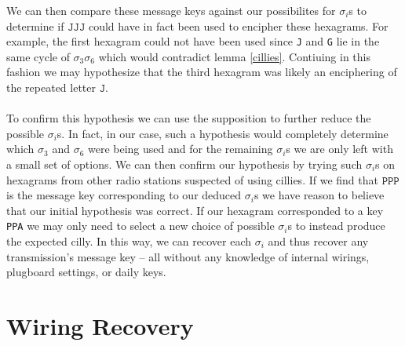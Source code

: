 We can then compare these message keys against our possibilites for $\sigma_i$s to determine if $\texttt{JJJ}$ could have in fact been used to encipher these hexagrams. For example, the first hexagram could not have been used since \texttt{J} and \texttt{G} lie in the same cycle of $\sigma_3\sigma_6$ which would contradict lemma \ref{cillies}. Contiuing in this fashion we may hypothesize that the third hexagram was likely an enciphering of the repeated letter $\texttt{J}$.
\\\\To confirm this hypothesis we can use the supposition to further reduce the possible $\sigma_i$s. In fact, in our case, such a hypothesis would completely determine which $\sigma_3$ and $\sigma_6$ were being used and for the remaining $\sigma_i$s we are only left with a small set of options. We can then confirm our hypothesis by trying such $\sigma_i$s on hexagrams from other radio stations suspected of using cillies. If we find that $\texttt{PPP}$ is the message key corresponding to our deduced $\sigma_i$s we have reason to believe that our initial hypothesis was correct. If our hexagram corresponded to a key \texttt{PPA} we may only need to select a new choice of possible $\sigma_i$s to instead produce the expected cilly. In this way, we can recover each $\sigma_i$ and thus recover any transmission's message key -- all without any knowledge of internal wirings, plugboard settings, or daily keys.
\section{Wiring Recovery}

